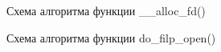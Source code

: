 \begin{figure}[H]
	\caption{Схема алгоритма функции \_\_alloc\_fd()}
\end{figure}

\begin{figure}[H]
	\caption{Схема алгоритма функции do\_filp\_open()}
\end{figure}

